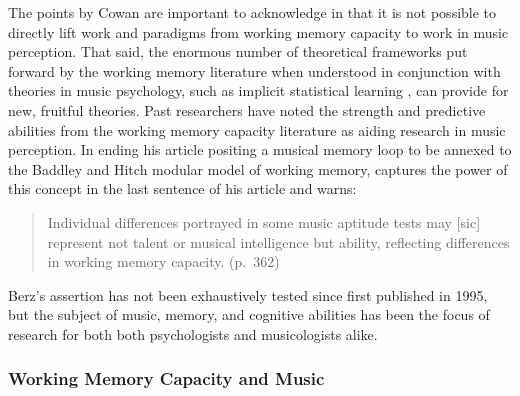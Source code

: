 \documentclass[12pt,]{book}
\begin{document}
The points by Cowan are important to acknowledge in that it is not possible to directly lift work and paradigms from working memory capacity to work in music perception.
That said, the enormous number of theoretical frameworks put forward by the working memory literature when understood in conjunction with theories in music psychology, such as implicit statistical learning \citep{saffranStatisticalLearningTone1999}, can provide for new, fruitful theories.
Past researchers have noted the strength and predictive abilities from the working memory capacity literature as aiding research in music perception.
In ending his article positing a musical memory loop to be annexed to the Baddley and Hitch modular model of working memory, \citet{berzWorkingMemoryMusic1995} captures the power of this concept in the last sentence of his article and warns:

\begin{quote}
Individual differences portrayed in some music aptitude tests may {[}sic{]} represent not talent or musical intelligence but ability, reflecting differences in working memory capacity. (p.~362)
\end{quote}

Berz's assertion has not been exhaustively tested since first published in 1995, but the subject of music, memory, and cognitive abilities has been the focus of research for both both psychologists and musicologists alike.

\hypertarget{working-memory-capacity-and-music}{%
\subsubsection{Working Memory Capacity and Music}\label{working-memory-capacity-and-music}}
\end{document}
